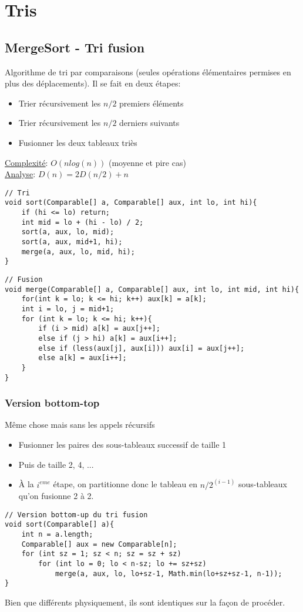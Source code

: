 \documentclass[10pt]{article}
\begin{document}
\section{Tris}
\subsection{MergeSort - Tri fusion}
Algorithme de tri par comparaisons (seules opérations élémentaires permises en plus des déplacements). Il se fait en deux étapes:
\begin{itemize}
\item Trier récursivement les $n/2$ premiers éléments
\item Trier récursivement les $n/2$ derniers suivants
\item Fusionner les deux tableaux triès 
\end{itemize}
\underline{Complexité}: $O(nlog(n))$ (moyenne et pire cas)\\
\underline{Analyse}: $D(n) = 2D(n/2) + n$
\begin{verbatim}
// Tri
void sort(Comparable[] a, Comparable[] aux, int lo, int hi){
	if (hi <= lo) return;
	int mid = lo + (hi - lo) / 2;
	sort(a, aux, lo, mid);
	sort(a, aux, mid+1, hi);
	merge(a, aux, lo, mid, hi);
} 
\end{verbatim}

\begin{verbatim}
// Fusion
void merge(Comparable[] a, Comparable[] aux, int lo, int mid, int hi){
	for(int k = lo; k <= hi; k++) aux[k] = a[k];
	int i = lo, j = mid+1;
	for (int k = lo; k <= hi; k++){
		if (i > mid) a[k] = aux[j++];
		else if (j > hi) a[k] = aux[i++];
		else if (less(aux[j], aux[i])) aux[i] = aux[j++];
		else a[k] = aux[i++];
	}
}
\end{verbatim}

\subsubsection{Version bottom-top}
Même chose mais sans les appels récursifs
\begin{itemize}
\item Fusionner les paires des sous-tableaux successif de taille 1
\item Puis de taille 2, 4, ...
\item À la $i^{eme}$ étape, on partitionne donc le tableau en $n/2^{(i-1)}$ sous-tableaux qu'on fusionne 2 à 2. 
\end{itemize}
\begin{verbatim}
// Version bottom-up du tri fusion
void sort(Comparable[] a){
	int n = a.length;
	Comparable[] aux = new Comparable[n];
	for (int sz = 1; sz < n; sz = sz + sz)
		for (int lo = 0; lo < n-sz; lo += sz+sz)
			merge(a, aux, lo, lo+sz-1, Math.min(lo+sz+sz-1, n-1));
}
\end{verbatim}
Bien que différents physiquement, ils sont identiques sur la façon de procéder.
\end{document}
